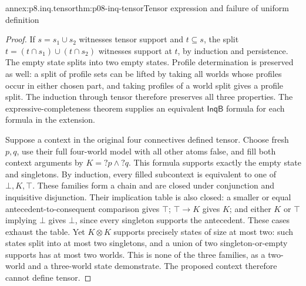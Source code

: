 \begin{annexitem}{annex:p8.inq.tensor}{thm:p08-inq-tensor}{Tensor expression and failure of uniform definition}
\begin{proof}
If \(s=s_1\cup s_2\) witnesses tensor support and \(t\subseteq s\),
the split \(t=(t\cap s_1)\cup(t\cap s_2)\) witnesses support at
\(t\), by induction and persistence. The empty state splits into two
empty states. Profile determination is preserved as well: a split of
profile sets can be lifted by taking all worlds whose profiles occur
in either chosen part, and taking profiles of a world split gives a
profile split. The induction through tensor therefore preserves all
three properties. The expressive-completeness theorem supplies an
equivalent \(\mathsf{InqB}\) formula for each formula in the extension.

Suppose a context in the original four connectives defined tensor.
Choose fresh \(p,q\), use their full four-world model with all other
atoms false, and fill both context arguments by
\(K=?p\land?q\). This formula supports exactly the empty state and
singletons. By induction, every filled subcontext is equivalent to
one of \(\bot,K,\top\). These families form a chain and are closed
under conjunction and inquisitive disjunction. Their implication table
is also closed: a smaller or equal antecedent-to-consequent comparison
gives \(\top\); \(\top\to K\) gives \(K\); and either \(K\)
or \(\top\) implying \(\bot\) gives \(\bot\), since every singleton
supports the antecedent. These cases exhaust the table.
Yet \(K\otimes K\) supports precisely states of size at most two:
such states split into at most two singletons, and a union of two
singleton-or-empty supports has at most two worlds. This is none of
the three families, as a two-world and a three-world state demonstrate.
The proposed context therefore cannot define tensor.
\end{proof}
\end{annexitem}

